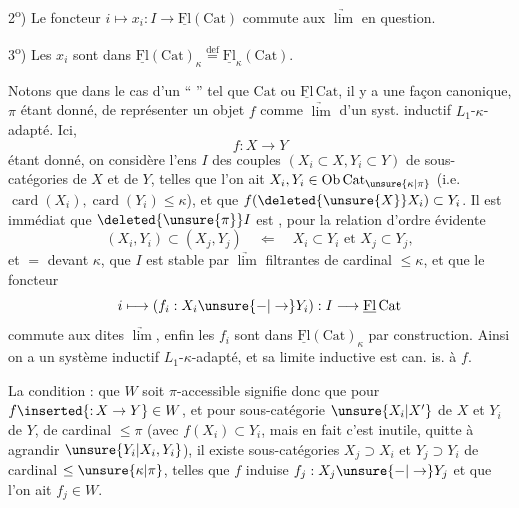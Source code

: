 2\textsuperscript{o}) Le foncteur $i\mapsto x_i:I\longrightarrow\underline{\mathrm{Fl}}(\mathrm{Cat})$ commute aux $\underrightarrow{\lim}$ en question.

3\textsuperscript{o}) Les $x_i$ sont dans $\underline{\mathrm{Fl}}(\mathrm{Cat})_\kappa\overset{\mathrm{def}}{=}\underline{\mathrm{Fl}}_\kappa(\mathrm{Cat})$.

Notons que dans le cas d'un `` '' tel que $\mathrm{Cat}$ ou $\underline{\mathrm{Fl}}\,\mathrm{Cat}$, il y a une façon canonique, $\pi$ étant donné, de représenter un objet $f$ comme $\underrightarrow{\lim}$ d'un syst. inductif $L_1$-$\kappa$-adapté.
Ici, 
\[
f:X\longrightarrow Y
\]
étant donné, on considère l'ens $I$ des
couples $(X_i\subset X,Y_i\subset Y)$ de sous-catégories de $X$ et de $Y$, telles que l'on ait $X_i,Y_i\in\mathrm{Ob}\,\mathrm{Cat}_{\unsure{\kappa|\pi}}$ (i.e. $\operatorname{card}(X_i),\operatorname{card}(Y_i)\leq\kappa$), et que $f(\deleted{\unsure{X}}X_i)\subset Y_i$.
Il est immédiat que $\deleted{\unsure{\pi}}I$ est , pour la relation d'ordre évidente
\[
(X_i,Y_i)\subset(X_j,Y_j)\quad\Longleftarrow\quad X_i\subset Y_i\text{ et }X_j\subset Y_j,
\]
et $=$  devant $\kappa$, que $I$ est stable par $\underrightarrow{\lim}$ filtrantes de cardinal $\leq\kappa$, et que le foncteur
\[
i\longmapsto(f_i:X_i\unsure{\mathbin{-}|\to}Y_i):I\longrightarrow\underline{\mathrm{Fl}}\,\mathrm{Cat}
\]
commute aux dites $\underrightarrow{\lim}$, enfin les $f_i$ sont dans $\underline{\mathrm{Fl}}(\mathrm{Cat})_\kappa$ par construction.
 Ainsi on a un système inductif $L_1$-$\kappa$-adapté, et  sa limite inductive est can. is. à $f$. 

  La condition : que $W$ soit $\pi$-accessible signifie donc que pour  $f\inserted{{:}\,X\to Y}\in W$,  et pour  sous-catégorie $\unsure{X_i|X'}$ de $X$ et $Y_i$ de $Y$, de cardinal $\leq\pi$ (avec $f(X_i)\subset Y_i$, mais en fait c'est inutile, quitte à agrandir $\unsure{Y_i|X_i,Y_i}$), il existe  sous-catégories
$X_j\supset X_i$ et $Y_j\supset Y_i$ de cardinal $\leq\unsure{\kappa|\pi}$, telles que $f$ induise $f_j:X_j\unsure{\mathbin{-}|\to}Y_j$ et que l'on ait $f_j\in W$.

